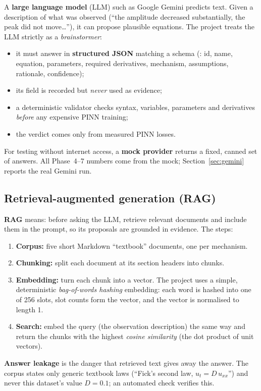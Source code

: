 A \textbf{large language model} (LLM) such as Google Gemini predicts text. Given a description of what was
observed (``the amplitude decreased substantially, the peak did not move\ldots''), it can propose plausible
equations. The project treats the LLM strictly as a \emph{brainstormer}:
\begin{itemize}
  \item it must answer in \textbf{structured JSON} matching a schema (: id, name, equation,
        parameters, required derivatives, mechanism, assumptions, rationale, confidence);
  \item its  field is recorded but \emph{never} used as evidence;
  \item a deterministic validator checks syntax, variables, parameters and derivatives \emph{before} any
        expensive PINN training;
  \item the verdict comes only from measured PINN losses.
\end{itemize}
For testing without internet access, a \textbf{mock provider} returns a fixed, canned set of answers. All
Phase~4--7 numbers come from the mock; Section~\ref{sec:gemini} reports the real Gemini run.

\subsection{Retrieval-augmented generation (RAG)}

\textbf{RAG} means: before asking the LLM, retrieve relevant documents and include them in the prompt, so its
proposals are grounded in evidence. The steps:
\begin{enumerate}
  \item \textbf{Corpus:} five short Markdown ``textbook'' documents, one per mechanism.
  \item \textbf{Chunking:} split each document at its section headers into chunks.
  \item \textbf{Embedding:} turn each chunk into a vector. The project uses a simple, deterministic
        \emph{bag-of-words hashing} embedding: each word is hashed into one of 256 slots, slot counts form the
        vector, and the vector is normalised to length 1.
  \item \textbf{Search:} embed the query (the observation description) the same way and return the chunks with
        the highest \emph{cosine similarity} (the dot product of unit vectors).
\end{enumerate}
\textbf{Answer leakage} is the danger that retrieved text gives away the answer. The corpus states only generic
textbook laws (``Fick's second law, $u_t = D\,u_{xx}$'') and never this dataset's value $D=0.1$; an automated
check verifies this.

